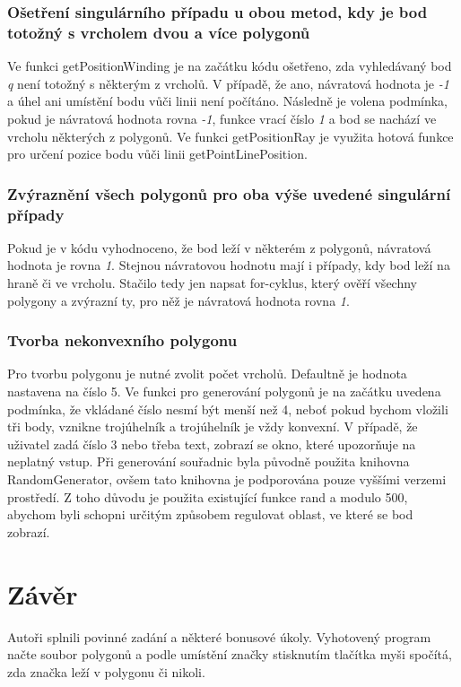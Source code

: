 \documentclass[a4paper, 12pt]{article}
\begin{document}
\subsubsection{Ošetření singulárního případu u obou metod, kdy je bod totožný s vrcholem dvou a více polygonů}
Ve funkci getPositionWinding je na začátku kódu ošetřeno, zda vyhledávaný bod \textit{q} není totožný s některým z vrcholů. V případě, že ano, návratová hodnota je \textit{-1} a úhel ani umístění bodu vůči linii není počítáno. Následně je volena podmínka, pokud je návratová hodnota rovna \textit{-1}, funkce vrací číslo \textit{1} a bod se nachází ve vrcholu některých z polygonů. Ve funkci getPositionRay je využita hotová funkce pro určení pozice bodu vůči linii getPointLinePosition.

\subsubsection{Zvýraznění všech polygonů pro oba výše uvedené singulární případy}
Pokud je v kódu vyhodnoceno, že bod leží v některém z polygonů, návratová hodnota je rovna \textit{1}. Stejnou návratovou hodnotu mají i případy, kdy bod leží na hraně či ve vrcholu. Stačilo tedy jen napsat for-cyklus, který ověří všechny polygony a zvýrazní ty, pro něž je návratová hodnota rovna \textit{1}. 

\subsubsection{Tvorba nekonvexního polygonu}
Pro tvorbu polygonu je nutné zvolit počet vrcholů. Defaultně je hodnota nastavena na číslo 5. Ve funkci pro generování polygonů je na začátku uvedena podmínka, že vkládané číslo nesmí být menší než 4, neboť pokud bychom vložili tři body, vznikne trojúhelník a trojúhelník je vždy konvexní. V případě, že uživatel zadá číslo 3 nebo třeba text, zobrazí se okno, které upozorňuje na neplatný vstup. Při generování souřadnic byla původně použita knihovna RandomGenerator, ovšem tato knihovna je podporována pouze vyššími verzemi prostředí. Z toho důvodu je použita existující funkce rand a modulo 500, abychom byli schopni určitým způsobem regulovat oblast, ve které se bod zobrazí.

\clearpage
\section{Závěr}
Autoři splnili povinné zadání a některé bonusové úkoly. Vyhotovený program načte soubor polygonů a podle umístění značky stisknutím tlačítka myši spočítá, zda značka leží v polygonu či nikoli. \\
\end{document}
